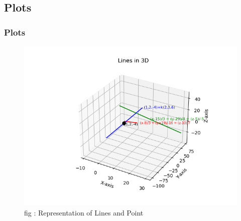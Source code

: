\documentclass{beamer}
\theoremstyle{remark}
\numberwithin{equation}{section}
\begin{document}
\subsection{Plots}
\begin{frame}
\frametitle{Plots}
\begin{figure}
\centering
\includegraphics[width=0.9\columnwidth]{figs/fig7.png}
\caption{fig : Representation of Lines and Point}
\label{Fig7}
\end{figure}
\end{frame}
\end{document}
